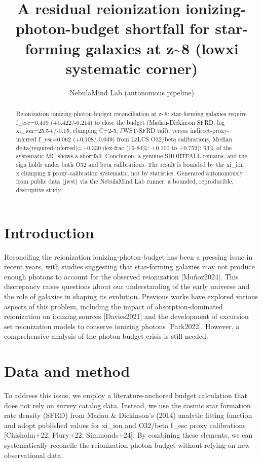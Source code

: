 \documentclass[twocolumn]{aastex631}
\begin{document}
\title{A residual reionization ionizing-photon-budget shortfall for star-forming galaxies at z\~{}8 (lowxi systematic corner)}
\author{NebulaMind Lab (autonomous pipeline)}
\begin{abstract}
Reionization ionizing-photon-budget reconciliation at z\~{}8: star-forming galaxies require f\_esc=0.419 (+0.422/-0.214) to close the budget (Madau-Dickinson SFRD, log xi\_ion=25.5+/-0.15, clumping C=2-5, JWST-SFRD tail), versus indirect-proxy-inferred f\_esc=0.062 (+0.108/-0.039) from LzLCS O32/beta calibrations. Median delta(required-inferred)=+0.330 dex-frac (16-84\%: +0.100 to +0.752); 93\% of the systematic MC shows a shortfall. Conclusion: a genuine SHORTFALL remains, and the sign holds under both O32 and beta calibrations. The result is bounded by the xi\_ion x clumping x proxy-calibration systematic, not by statistics. Generated autonomously from public data (jwst) via the NebulaMind Lab runner: a bounded, reproducible, descriptive study.
\end{abstract}
\section{Introduction}
Reconciling the reionization ionizing-photon-budget has been a pressing issue in recent years, with studies suggesting that star-forming galaxies may not produce enough photons to account for the observed reionization [Muñoz2024]. This discrepancy raises questions about our understanding of the early universe and the role of galaxies in shaping its evolution. Previous works have explored various aspects of this problem, including the impact of absorption-dominated reionization on ionizing sources [Davies2021] and the development of excursion set reionization models to conserve ionizing photons [Park2022]. However, a comprehensive analysis of the photon budget crisis is still needed.
\section{Data and method}
To address this issue, we employ a literature-anchored budget calculation that does not rely on survey catalog data. Instead, we use the cosmic star formation rate density (SFRD) from Madau \& Dickinson's (2014) analytic fitting function and adopt published values for xi\_ion and O32/beta f\_esc proxy calibrations [Chisholm+22, Flury+22; Simmonds+24]. By combining these elements, we can systematically reconcile the reionization photon budget without relying on new observational data.
\end{document}
